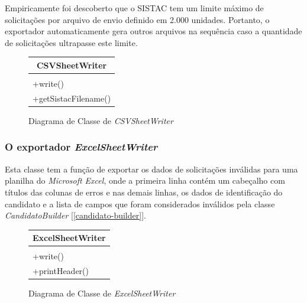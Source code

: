 \documentclass[
	12pt,			%
	openright,		%
	oneside,	
	a4paper,		%
	english,		%
	brazil			%
]{abntex2/abntex2}  %
\begin{document}
					Empiricamente foi descoberto que o SISTAC tem um limite máximo de solicitações por arquivo de envio definido em 2.000 unidades. Portanto, o exportador automaticamente gera outros arquivos na sequência caso a quantidade de solicitações ultrapasse este limite.
	
					\begin{figure}[ht]
						\begin{center}
							
							\caption{Diagrama de Classe de \textit{CSVSheetWriter}}
							
							\begin{tabular}{|l|}
								\hline
								\multicolumn{1}{|c|}{\textbf{CSVSheetWriter}} \\ \hline
								\\ \hline
								+write()                                      \\
								+getSistacFilename()                          \\ \hline
							\end{tabular}
							
						\end{center}
					\end{figure}
	
				\subsubsection{O exportador \textit{ExcelSheetWriter}}
	
					Esta classe tem a função de exportar os dados de solicitações inválidas para uma planilha do \textit{Microsoft Excel}, onde a primeira linha contém um cabeçalho com títulos das colunas de erros e nas demais linhas, os dados de identificação do candidato e a lista de campos que foram considerados inválidos pela classe \textit{CandidatoBuilder} [\ref{candidato-builder}].
	
					\begin{figure}[ht]
						\begin{center}
							
							\caption{Diagrama de Classe de \textit{ExcelSheetWriter}}
							
							\begin{tabular}{|l|}
								\hline
								\multicolumn{1}{|c|}{\textbf{ExcelSheetWriter}} \\ \hline
								\\ \hline
								+write()                                      \\
								+printHeader()                          \\ \hline
							\end{tabular}
							
						\end{center}
					\end{figure}
	
\end{document}
